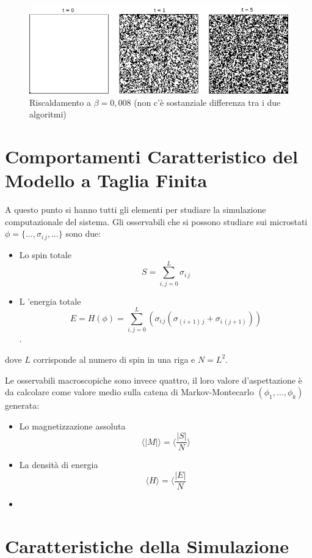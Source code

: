 \documentclass[11pt]{article}
\theoremstyle{plain}
\begin{document}
     \begin {figure}
      \begin{center}
		\caption{\footnotesize  Riscaldamento a $\beta = 0,008 $ (non c'è sostanziale differenza tra i due algoritmi)}\label{fig:4}
        \includegraphics[scale=0.5]{Immagini/Metro_riscaldamento.jpg}
      \end{center}
    \end {figure} 


\section{Comportamenti Caratteristico del Modello a Taglia Finita}\label{Parte A}
A questo punto si hanno tutti gli elementi per studiare la simulazione computazionale del sistema.
Gli osservabili che si possono studiare sui microstati $\phi=\lbrace \ldots, \sigma_{i\, j} ,\ldots\rbrace$ sono due:
\begin{itemize}
\item Lo spin totale $$S= \sum_{i,j=0}^{L}\sigma_{i\, j}$$
\item L 'energia totale $$ E = H(\phi) = \sum_{i,j=0}^{L}(\sigma_{i\, j}(\sigma_{(i+1)\, j} + \sigma_{i\, (j+1)}))$$.
\end{itemize}
dove $L$ corrisponde al numero di spin in una riga e $N=L^2$.

Le osservabili macroscopiche sono invece quattro, il loro valore d'aspettazione è da calcolare come valore medio sulla catena di Markov-Montecarlo $(\phi_1,\ldots,\phi_k)$ generata:
\begin{itemize}
\item Lo magnetizzazione assoluta $$\langle|M|\rangle= \langle\dfrac{|S|}{N}\rangle$$
\item La densità di energia $$\langle H \rangle = \langle \dfrac{|E|}{N} $$
\item 
\end{itemize}


\section{Caratteristiche della Simulazione}\label{Parte B}
\end{document}

